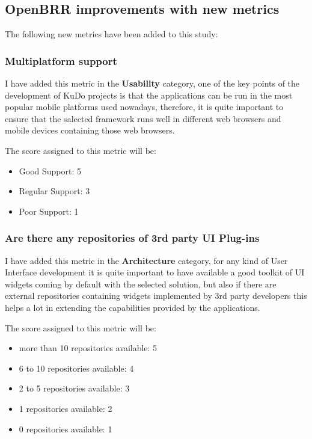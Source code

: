 \documentclass[a4paper,12pt]{book}
\begin{document}
\subsection{OpenBRR improvements with new metrics}
\label{OpenBRR improvements with new metrics}

The following new metrics have been added to this study:

\subsubsection{Multiplatform support}
\label{Multiplatform support}

I have added this metric in the \textbf{Usability} category, one of the key points of the development of KuDo projects is that the applications can be run in the most popular mobile platforms used nowadays, therefore, it is quite important to ensure that the salected framework runs well in different web browsers and mobile devices containing those web browsers.

The score assigned to this metric will be:
\begin{itemize}
 \item Good Support: 5
 \item Regular Support: 3
 \item Poor Support: 1
\end{itemize}

\subsubsection{Are there any repositories of 3rd party UI Plug-ins}
\label{Are there any repositories of 3rd party UI Plug-ins}

I have added this metric in the \textbf{Architecture} category, for any kind of User Interface development it is quite important to have available a good toolkit of UI widgets coming by default with the selected solution, but also if there are external repositories containing widgets implemented by 3rd party developers this helps a lot in extending the capabilities provided by the applications.

The score assigned to this metric will be:
\begin{itemize}
 \item more than 10 repositories available: 5
 \item 6 to 10 repositories available: 4
 \item 2 to 5 repositories available: 3
 \item 1 repositories available: 2
 \item 0 repositories available: 1
\end{itemize}
\end{document}
